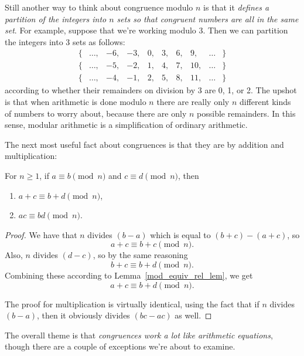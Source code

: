 Still another way to think about congruence modulo $n$ is that it
\emph{defines a partition of the integers into $n$ sets so that congruent
numbers are all in the same set}.  For example, suppose that we're working
modulo 3.  Then we can partition the integers into 3 sets as follows:
%
\[
\begin{array}{cccccccccc}
\{ & \dots, & -6, & -3, & 0, & 3, & 6, & 9, & \dots & \} \\
\{ & \dots, & -5, & -2, & 1, & 4, & 7, & 10, & \dots & \} \\
\{ & \dots, & -4, & -1, & 2, & 5, & 8, & 11, & \dots & \}
\end{array}
\]
according to whether their remainders on division by 3 are 0, 1, or 2.
The upshot is that when arithmetic is done modulo $n$ there are really
only $n$ different kinds of numbers to worry about, because there are only
$n$ possible remainders.  In this sense, modular arithmetic is a
simplification of ordinary arithmetic.\iffalse
 and thus is a good reasoning tool.\fi


The next most useful fact about congruences is that they are
 by addition and multiplication:

\begin{lemma}\label{mod_congruence_lem} For $n \geq 1$, if
$a \equiv b \pmod{n}$ and $c \equiv d \pmod{n}$, then
\begin{enumerate}
\item $a + c \equiv b + d \pmod{n}$,\label{mod_congruence_lem+}
\item $a c \equiv b d \pmod{n}$.\label{mod_congruence_lem*}
\end{enumerate}
\end{lemma}

\begin{proof}
We have that $n$ divides $(b-a)$ which is equal to $(b+c)-(a+c)$, so
\[
a+c \equiv b+c \pmod{n}.
\]
Also, $n$ divides $(d-c)$, so by the same reasoning
\[
b + c \equiv b + d \pmod{n}.
\]
Combining these according to Lemma~\ref{mod_equiv_rel_lem}, we get
\[
a + c  \equiv b + d \pmod{n}.
\]
 
The proof for multiplication is virtually identical, using the fact
that if $n$ divides $(b-a)$, then it obviously divides $(bc-ac)$ as
well.
\end{proof}

The overall theme is that \emph{congruences work a lot like arithmetic
  equations}, though there are a couple of exceptions we're about to
examine.

